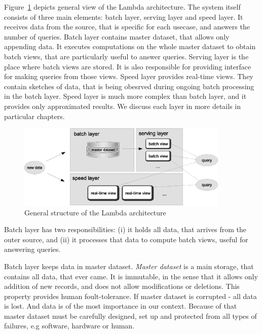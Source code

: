 
Figure~\ref{fig:lambda_architecture} depicts general view of the Lambda
architecture.
The system itself consists of three main elements: batch layer, serving layer
and speed layer.
It receives data from the source, that is specific for each usecase, and answers
the number of queries.
Batch layer contains master dataset, that allows only appending data.
It executes computations on the whole master dataset to obtain batch views,
that are particularly useful to answer queries.
Serving layer is the place where batch views are stored.
It is also responsible for providing interface for making queries from those views.
Speed layer provides real-time views.
They contain sketches of data, that is being obesrved during ongoing batch
processing in the batch layer.
Speed layer is much more complex than batch layer, and it provides only approximated results.
We discuss each layer in more details in particular chapters.

\begin{figure}[H]
  \centering
  \includegraphics [width=0.9\textwidth]{images/LambdaArchitecture}
  \caption{General structure of the Lambda architecture}
  \label{fig:lambda_architecture}
\end{figure}


Batch layer has two responsibilities: (i) it holds all data, that arrives from
the outer source, and (ii) it processes that data to compute batch views, useful
for answering queries.

Batch layer keeps data in master dataset.
\textit{Master dataset}  is a main storage, that contains
all data, that ever came.
It is immutable, in the sense that it allows only addition of new records, and
does not allow modifications or deletions.
This property provides human foult-tolerance.
If master dataset is corrupted - all data is lost.
And data is of the most importance in our context.
Because of that master dataset must be carefully designed, set up and protected
from all types of failures, e.g software, hardware or human.

